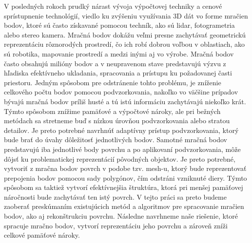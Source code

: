 \noindent V posledných rokoch prudký nárast vývoja výpočtovej techniky a cenové sprístupnenie technológií, viedlo ku zvýšeniu využívania 3D dát vo forme mračien bodov, ktoré sú často získavané pomocou techník, ako sú \acrshort{lidar}, fotogrametria alebo stereo kamera. Mračná bodov dokážu veľmi presne zachytávať geometrickú reprezentáciu rôznorodých prostredí, čo ich robí dobrou voľbou v oblastiach, ako sú robotika, mapovanie prostredí a medzi inými aj vo výrobe.
\newline\indent Mračná bodov často obsahujú milióny bodov a v neupravenom stave predstavujú výzvu z hľadiska efektívneho ukladania, spracovania a prístupu ku požadovanej časti priestoru. Jedným spôsobom pre odstránenie tohto problému, je zníženie celkového počtu bodov pomocou podvzorkovania, nakoľko vo väčšine prípadov bývajú mračná bodov príliš husté a tú istú informáciu zachytávajú niekoľko krát. Týmto spôsobom znížime pamäťové a výpočtové nároky, ale pri bežných metódach sa stretneme buď s nízkou úrovňou podvzorkovania alebo stratou detailov. Je preto potrebné navrhnúť adaptívny prístup podvzorkovania, ktorý bude brať do úvahy dôležitosť jednotlivých bodov.
\newline\indent Samotné mračná bodov predstavujú iba jednotlivé body povrchu a po aplikovaní podvzorkovania, môže dôjsť ku problematickej reprezentácií pôvodných objektov. Je preto potrebné, vytvoriť z mračna bodov povrch v podobe tzv. mesh-u, ktorý bude reprezentovať prepojenia bodov pomocou sady polygónov, čím odstráni vzniknuté diery. Týmto spôsobom sa taktiež vytvorí efektívnejšia štruktúra, ktorá pri menšej pamäťovej náročnosti bude zachytávať ten istý povrch.
\newline\indent V tejto práci sa preto budeme zaoberať preskúmaním existujúcich metód a algoritmov pre spracovanie mračien bodov, ako aj rekonštrukciu povrchu. Následne navrhneme naše riešenie, ktoré spracuje mračno bodov, vytvorí reprezentáciu jeho povrchu a zároveň zníži celkové pamäťové nároky.